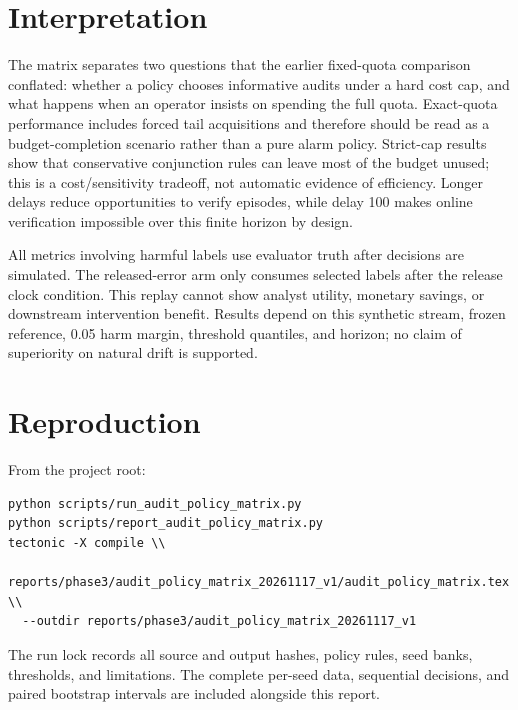 \documentclass[10pt]{article}
\begin{document}
\section{Interpretation}
The matrix separates two questions that the earlier fixed-quota comparison conflated: whether a policy chooses informative audits under a hard cost cap, and what happens when an operator insists on spending the full quota. Exact-quota performance includes forced tail acquisitions and therefore should be read as a budget-completion scenario rather than a pure alarm policy. Strict-cap results show that conservative conjunction rules can leave most of the budget unused; this is a cost/sensitivity tradeoff, not automatic evidence of efficiency. Longer delays reduce opportunities to verify episodes, while delay 100 makes online verification impossible over this finite horizon by design.

All metrics involving harmful labels use evaluator truth after decisions are simulated. The released-error arm only consumes selected labels after the release clock condition. This replay cannot show analyst utility, monetary savings, or downstream intervention benefit. Results depend on this synthetic stream, frozen reference, 0.05 harm margin, threshold quantiles, and horizon; no claim of superiority on natural drift is supported.
\section{Reproduction}
From the project root:
\begin{verbatim}
python scripts/run_audit_policy_matrix.py
python scripts/report_audit_policy_matrix.py
tectonic -X compile \\
  reports/phase3/audit_policy_matrix_20261117_v1/audit_policy_matrix.tex \\
  --outdir reports/phase3/audit_policy_matrix_20261117_v1
\end{verbatim}
The run lock records all source and output hashes, policy rules, seed banks, thresholds, and limitations. The complete per-seed data, sequential decisions, and paired bootstrap intervals are included alongside this report.
\end{document}

